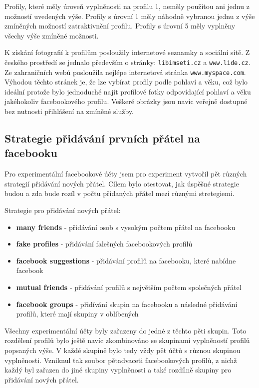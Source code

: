 \documentclass[thesis=M,czech]{FITthesis}[2013/05/10]
\begin{document}
Profily, které měly úroveň vyplněnosti na profilu 1, neměly použitou ani jednu z možností uvedených výše. Profily s úrovní 1 měly náhodně vybranou jednu z výše zmíněných možností zatraktivnění profilu. Profily s úrovní 5 měly vyplněny všechy výše zmíněné možnosti.

K získání fotografií k profilům posloužily internetové seznamky a sociální sítě. Z českého prostředí se jednalo především o stránky: \verb|libimseti.cz| a \verb|www.lide.cz|. Ze zahraničních webů posloužila nejlépe internetová stránka \verb|www.myspace.com|. Výhodou těchto stránek je, že lze vybírat profily podle pohlaví a věku, což bylo ideální protože bylo jednoduché najít profilové fotky odpovídající pohlaví a věku jakéhokoliv facebookového profilu. Veškeré obrázky jsou navíc veřejně dostupné bez nutnosti přihlášení na zmíněné služby.

\subsection{Strategie přidávání prvních přátel na facebooku}

Pro experimentální facebookové účty jsem pro experiment vytvořil pět různých strategií přidávání nových přátel. Cílem bylo otestovat, jak úspěšné strategie budou a zda bude rozíl v počtu přidaných přátel mezi různými stretegiemi. 

Strategie pro přidávání nových přátel:

\begin{itemize}
  \item \textbf{many friends} - přidávání osob s vysokým počtem přátel na facebooku
  \item \textbf{fake profiles} - přidávání falešných facebookových profilů
  \item \textbf{facebook suggestions} - přidávání profilů na facebooku, které nabídne facebook 
  \item \textbf{mutual friends} - přidávání profilů s největším počtem společných přátel
  \item \textbf{facebook groups} - přidívání skupin na facebooku a následné přidávání profilů, které mají skupiny v oblíbených
\end{itemize}

Všechny experimentální účty byly zařazeny do jedné z těchto pěti skupin. Toto rozdělení profilů bylo ještě navíc zkombinováno se skupinami vyplněností profilů popsaných výše. V každé skupině bylo tedy vždy pět účtů s různou skupinou vyplněnosti. Vzniknul tak soubor pětadvaceti facebookových profilů, z nichž každý byl zařazen do jiné skupiny vyplněnosti a také rozdílně skupiny pro přidávání nových přátel.
\end{document}
